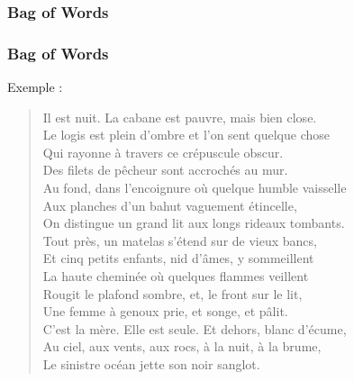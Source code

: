 \begin{frame}
\end{frame}

\begin{frame}
\end{frame}

\begin{frame}
\end{frame}

\begin{frame}
  \frametitle{Bag of Words}
\end{frame}

\begin{frame}[t]
  \frametitle{Bag of Words}
  \vspace{1cm}
  Exemple :

  \begin{quote}
    Il est nuit. La cabane est pauvre, mais bien close.\\
    Le logis est plein d'ombre et l'on sent quelque chose\\
    Qui rayonne à travers ce crépuscule obscur.\\
    Des filets de pêcheur sont accrochés au mur.\\
    Au fond, dans l'encoignure où quelque humble vaisselle\\
    Aux planches d'un bahut vaguement étincelle,\\
    On distingue un grand lit aux longs rideaux tombants.\\
    Tout près, un matelas s'étend sur de vieux bancs,\\
    Et cinq petits enfants, nid d'âmes, y sommeillent\\
    La haute cheminée où quelques flammes veillent\\
    Rougit le plafond sombre, et, le front sur le lit,\\
    Une femme à genoux prie, et songe, et pâlit.\\
    C'est la mère. Elle est seule. Et dehors, blanc d'écume,\\
    Au ciel, aux vents, aux rocs, à la nuit, à la brume,\\
    Le sinistre océan jette son noir sanglot.
  \end{quote}
\end{frame}

